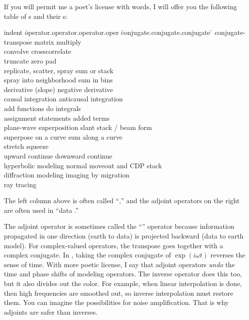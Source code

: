 \par
If you will permit me a poet's license with words,
I will offer you the following table
of s and their s:
\begin{tabbing}
indent \= operator.operator.operator.oper \=  conjugate.conjugate.conjugate \= \kill
\>		\>conjugate-transpose matrix multiply \\
\>convolve 			\>crosscorrelate	\\
\>truncate			\>zero pad	\\
\>replicate, scatter, spray	\>sum or stack	\\
\>spray into neighborhood	\>sum in bins	\\
\>derivative (slope) 		\>negative derivative	\\
\>causal integration 		\>anticausal integration	\\
\>add functions			\>do integrals	\\
\>assignment statements		\>added terms	\\
\>plane-wave superposition	\>slant stack / beam form	\\
\>superpose on a curve		\>sum along a curve \\
\>stretch			\>squeeze	\\
\>upward continue		\>downward continue \\
\>hyperbolic modeling	 	\>normal moveout and CDP stack	\\
\>diffraction modeling	 	\>imaging by migration	\\
\>ray tracing			\>	\\
\end{tabbing}

\par
The left column above is often called ``,''
and the adjoint operators on the right are often
used in ``data .''

\par
The adjoint operator is sometimes called
the ``'' operator
because information propagated in one direction (earth to data) is projected
backward (data to earth model).
For complex-valued operators,
the transpose goes together with a complex conjugate.
In , taking the complex conjugate
of $\exp(i\omega t)$ reverses the sense of time.
With more poetic license, I say that adjoint operators
{\it undo}
the time and phase shifts of modeling operators.
The inverse operator does this too,
but it also divides out the color.
For example, when linear interpolation is done,
then high frequencies are smoothed out,
so inverse interpolation must restore them.
You can imagine the possibilities for noise amplification.
That is why adjoints are safer than inverses.

